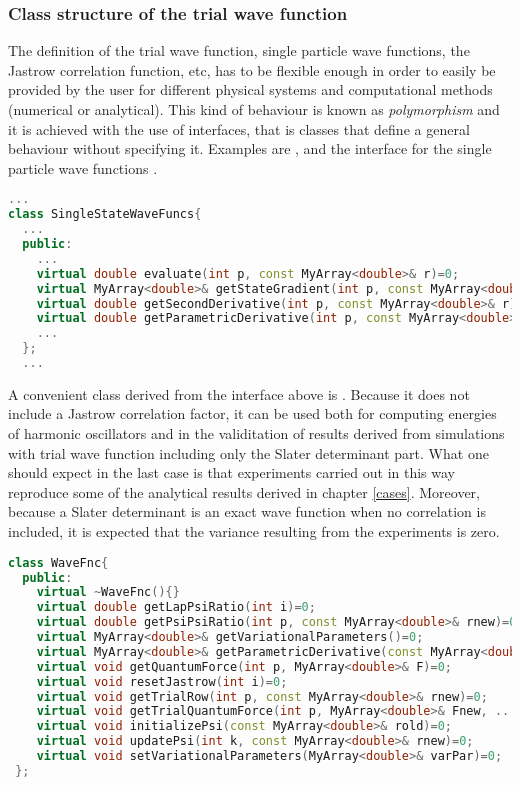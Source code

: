 \subsubsection{Class structure of the trial wave function}

The definition of the trial wave function, single particle wave functions, the Jastrow correlation function, etc, has to be flexible enough in order to easily be provided by the user for different physical systems and computational methods (numerical or analytical). This kind of behaviour is known as \emph{polymorphism} and it is achieved with the use of interfaces, that is classes that define a general behaviour without specifying it. Examples are ,  and the interface for the single particle wave functions .
\begin{lstlisting}[language=c++]
...
class SingleStateWaveFuncs{
  ...
  public:
    ...
    virtual double evaluate(int p, const MyArray<double>& r)=0;
    virtual MyArray<double>& getStateGradient(int p, const MyArray<double>& r)=0;
    virtual double getSecondDerivative(int p, const MyArray<double>& r)=0;
    virtual double getParametricDerivative(int p, const MyArray<double>& r)=0;
    ...
  };
  ...
\end{lstlisting}
A convenient class derived from the interface above is . Because it does not include a Jastrow correlation factor, it can be used both for computing energies of harmonic oscillators and in the validitation of results derived from simulations with trial wave function including only the Slater determinant part. What one should expect in the last case is that experiments carried out in this way reproduce some of the analytical results derived in chapter \ref{cases}. Moreover, because a Slater determinant is an exact wave function when no correlation is included, it is expected that the variance resulting from the experiments is zero. 
\begin{lstlisting}[language=c++]
class WaveFnc{
  public:
    virtual ~WaveFnc(){} 
    virtual double getLapPsiRatio(int i)=0;
    virtual double getPsiPsiRatio(int p, const MyArray<double>& rnew)=0;
    virtual MyArray<double>& getVariationalParameters()=0;
    virtual MyArray<double>& getParametricDerivative(const MyArray<double>& r)=0;
    virtual void getQuantumForce(int p, MyArray<double>& F)=0;
    virtual void resetJastrow(int i)=0;
    virtual void getTrialRow(int p, const MyArray<double>& rnew)=0;
    virtual void getTrialQuantumForce(int p, MyArray<double>& Fnew, ...) = 0;
    virtual void initializePsi(const MyArray<double>& rold)=0;
    virtual void updatePsi(int k, const MyArray<double>& rnew)=0;	
    virtual void setVariationalParameters(MyArray<double>& varPar)=0;	
 };
\end{lstlisting}
